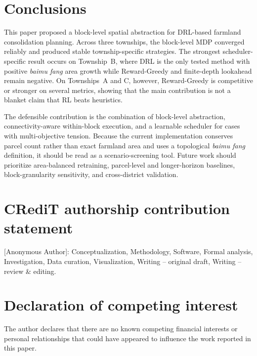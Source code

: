 \documentclass[preprint,12pt]{elsarticle}
\begin{document}
\section{Conclusions}
\label{sec:conclusions}

This paper proposed a block-level spatial abstraction for DRL-based farmland consolidation planning. Across three townships, the block-level MDP converged reliably and produced stable township-specific strategies. The strongest scheduler-specific result occurs on Township~B, where DRL is the only tested method with positive \textit{baimu fang} area growth while Reward-Greedy and finite-depth lookahead remain negative. On Townships~A and C, however, Reward-Greedy is competitive or stronger on several metrics, showing that the main contribution is not a blanket claim that RL beats heuristics.

The defensible contribution is the combination of block-level abstraction, connectivity-aware within-block execution, and a learnable scheduler for cases with multi-objective tension. Because the current implementation conserves parcel count rather than exact farmland area and uses a topological \textit{baimu fang} definition, it should be read as a scenario-screening tool. Future work should prioritize area-balanced retraining, parcel-level and longer-horizon baselines, block-granularity sensitivity, and cross-district validation.



\section*{CRediT authorship contribution statement}
[Anonymous Author]: Conceptualization, Methodology, Software, Formal analysis, Investigation, Data curation, Visualization, Writing -- original draft, Writing -- review \& editing.

\section*{Declaration of competing interest}
The author declares that there are no known competing financial interests or personal relationships that could have appeared to influence the work reported in this paper.
\end{document}
